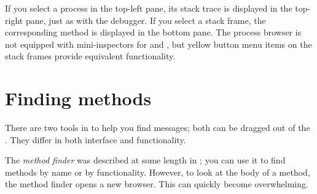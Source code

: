 \documentclass[a4paper,10pt,twoside]{book}
\begin{document}
If you select a process in the top-left pane, its stack trace is displayed in the top-right pane, just as with the debugger.
If you select a stack frame, the corresponding method is displayed in the bottom pane.
The process browser is not equipped with mini-inspectors for \self and , but yellow button menu items on the stack frames provide equivalent functionality.



\section{Finding methods}
\label{sec:methodFinder} 

There are two tools in \sq to help you find messages; both can be dragged out of the \toolsflapind.
They differ in both interface and functionality.

The \emph{method finder} was described at some length in ; you can use it to find methods by name or by functionality. 
However, to look at the body of a method, the method finder opens a new browser.
This can quickly become overwhelming.
\end{document}

